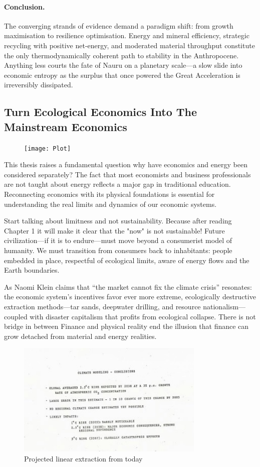\documentclass[a4paper,12pt]{article}
\begin{document}
\paragraph{Conclusion.}
The converging strands of evidence demand a paradigm shift: from growth
maximisation to resilience optimisation.  Energy and mineral efficiency,
strategic recycling with positive net-energy, and moderated material
throughput constitute the only thermodynamically coherent path to stability in
the Anthropocene.  Anything less courts the fate of Nauru on a planetary
scale—a slow slide into economic entropy as the surplus that once powered the
Great Acceleration is irreversibly dissipated.

\subsection{Turn Ecological Economics Into The Mainstream Economics}
\begin{figure}[h]
\texttt{[image: Plot]}
\end{figure}
This thesis raises a fundamental question why have economics and energy been considered separately? The fact that most economists and business professionals are not taught about energy reflects a major gap in traditional education. Reconnecting economics with its physical foundations is essential for understanding the real limits and dynamics of our economic systems.

Start talking about limitness and not sustainability. Because after reading Chapter 1 it will make it clear that the "now" is not sustainable! Future civilization—if it is to endure—must move beyond a consumerist model of humanity. We must transition from consumers back to inhabitants: people embedded in place, respectful of ecological limits, aware of energy flows and the Earth boundaries.

As Naomi Klein claims that “the market cannot fix the climate crisis” resonates: the economic system’s incentives favor ever more extreme, ecologically destructive extraction methods—tar sands, deepwater drilling, and resource nationalism—coupled with disaster capitalism that profits from ecological collapse. There is not bridge in between Finance and physical reality end the illusion that finance can grow detached from material and energy realities.

\begin{figure}[H]
  \centering
  \includegraphics[width=0.8\textwidth]{figures/climate_modelling.jpg}
  \caption{Projected linear extraction from today}
  \label{fig:depletion-chart}
\end{figure}
\end{document}
